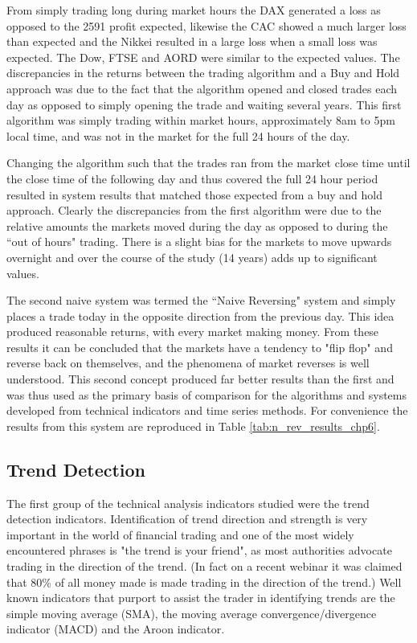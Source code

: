 From simply trading long during market hours the DAX generated a loss as opposed to the 2591 profit expected, likewise the CAC showed a much larger loss than expected and the Nikkei resulted in a large loss when a small loss was expected. The Dow, FTSE and AORD were similar to the expected values. The discrepancies in the returns between the trading algorithm and a Buy and Hold approach was due to
the fact that the algorithm opened and closed trades each day as opposed to simply opening the trade and waiting several years. This first algorithm was simply trading within market hours, approximately 8am to 5pm local time, and was not in the market for the full 24 hours of the day.

Changing the algorithm such that the trades ran from the market close time until the close time of the following day and thus covered the full 24 hour period resulted in system results that matched those expected from a buy and hold approach.  Clearly the discrepancies from the first algorithm were due to the relative amounts the markets moved during the day as opposed to during the \textquotedblleft out of hours" trading. There is a slight bias for the markets to move upwards overnight and over the course of the study (14 years) adds up to significant values.  

The second naive system was termed the \textquotedblleft Naive Reversing" system and simply places a trade today in the opposite direction from the previous day. This idea produced reasonable returns, with every market making money. From these results it can be concluded that the markets have a tendency to "flip flop" and reverse back on themselves, and the phenomena of market reverses is well understood. This second concept produced far better results than the first and was thus used as the primary basis of comparison for the algorithms and systems developed from technical indicators and time series methods. For convenience the results from this system are reproduced in Table \ref{tab:n_rev_results_chp6}.




\subsection{Trend Detection}
The first group of the technical analysis indicators studied were the trend detection indicators. Identification of trend direction and strength is very important in the world of financial trading and one of the most widely encountered phrases is "the trend is your friend", as most authorities advocate trading in the direction of the trend. (In fact on a recent webinar it was claimed that 80\% of all money made is made trading in the direction of the trend.)  Well known indicators that purport to assist the trader in identifying trends are the simple moving average (SMA), the moving average convergence/divergence indicator (MACD) and the Aroon indicator.

